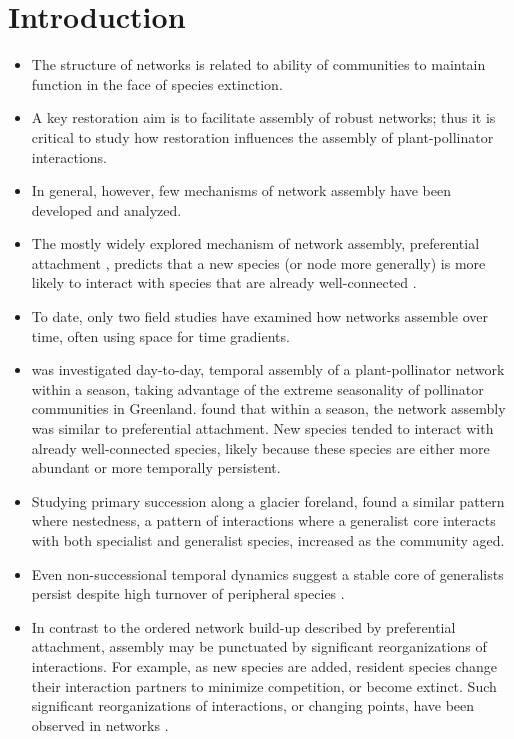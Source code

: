 \documentclass[12pt]{article}
\begin{document}
\section*{Introduction}
\label{sec:introduction}
\begin{itemize}
\item The structure of networks is related to ability of communities
  to maintain function in the face of species extinction.
\item A key restoration aim is to facilitate assembly of robust
  networks; thus it is critical to study how restoration
  influences the assembly of plant-pollinator interactions.
\item In general, however, few mechanisms of network assembly have
  been developed and analyzed.
\item The mostly widely explored mechanism of network assembly,
  preferential attachment \citep{barabasi1999emergence}, predicts that
  a new species (or node more generally) is more likely to interact
  with species that are already well-connected \citep[''the
  rich-get-richer'' principle,][]{barabasi1999emergence}.
\item To date, only two field studies have examined how networks
  assemble over time, often using space for time gradients.
\item \cite{Olesen2008} was investigated day-to-day, temporal assembly
  of a plant-pollinator network within a season, taking advantage of
  the extreme seasonality of pollinator communities in Greenland.
  \cite{Olesen2008} found that within a season, the network assembly
  was similar to preferential attachment. New species tended to
  interact with already well-connected species, likely because these
  species are either more abundant or more temporally persistent.
\item Studying primary succession along a glacier foreland,
  \cite{albrecht2010plant} found a similar pattern where nestedness, a
  pattern of interactions where a generalist core interacts with both
  specialist and generalist species, increased as the community
  aged. %
\item Even non-successional temporal dynamics suggest a stable core of
  generalists persist despite high turnover of peripheral species
  \citep{fang2012relative, diaz2010changes, alarcon2008year}.
\item In contrast to the ordered network build-up described by
  preferential attachment, assembly may be punctuated by significant
  reorganizations of interactions. For example, as new species are
  added, resident species change their interaction partners to
  minimize competition, or become extinct. Such significant
  reorganizations of interactions, or changing points, have been
  observed in networks \citep{peel2014detecting}.
\end{itemize}
\end{document}
